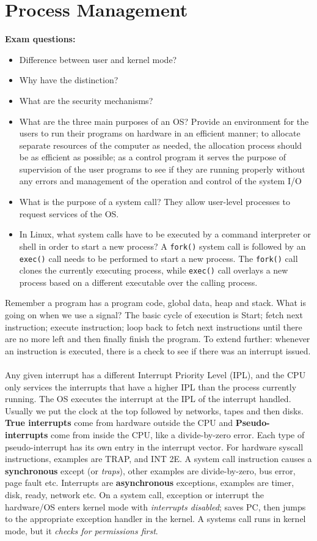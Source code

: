 \documentclass[twoside]{article}
\begin{document}
\section{Process Management}
\textbf{Exam questions:} \begin{itemize}
\item Difference between user and kernel mode?
\item Why have the distinction?
\item What are the security mechanisms?
\item What are the three main purposes of an OS? Provide an environment for the users to run their programs on hardware in an efficient manner; to allocate separate resources of the computer as needed, the allocation process should be as efficient as possible; as a control program it serves the purpose of supervision of the user programs to see if they are running properly without any errors and management of the operation and control of the system I/O
\item What is the purpose of a system call? They allow user-level processes to request services of the OS.
\item In Linux, what system calls have to be executed by a command interpreter or shell in order to start a new process? A \texttt{fork()} system call is followed by an \texttt{exec()} call needs to be performed to start a new process. The \texttt{fork()} call clones the currently executing process, while \texttt{exec()} call overlays a new process based on a different executable over the calling process.
\end{itemize}
Remember a program has a program code, global data, heap and stack. What is going on when we use a signal? The basic cycle of execution is Start; fetch next instruction; execute instruction; loop back to fetch next instructions until there are no more left and then finally finish the program. To extend further: whenever an instruction is executed, there is a check to see if there was an interrupt issued. \\ \\
Any given interrupt has a different Interrupt Priority Level (IPL), and the CPU only services the interrupts that have a higher IPL than the process currently running. The OS executes the interrupt at the IPL of the interrupt handled. Usually we put the clock at the top followed by networks, tapes and then disks. \textbf{True interrupts} come from hardware outside the CPU and \textbf{Pseudo-interrupts} come from inside the CPU, like a divide-by-zero error. Each type of pseudo-interrupt has its own entry in the interrupt vector. For hardware syscall instructions, examples are TRAP, and INT 2E. A system call instruction causes a \textbf{synchronous} except (or \emph{traps}), other examples are divide-by-zero, bus error, page fault etc. Interrupts are \textbf{asynchronous} exceptions, examples are timer, disk, ready, network etc. On a system call, exception or interrupt the hardware/OS enters kernel mode with \emph{interrupts disabled}; saves PC, then jumps to the appropriate exception handler in the kernel. A systems call runs in kernel mode, but it \emph{checks for permissions first}.
\end{document}
